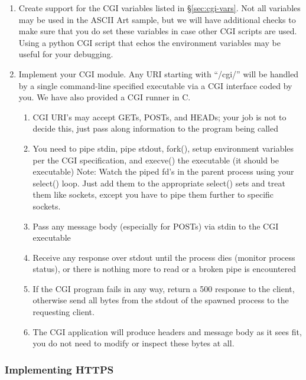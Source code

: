 \begin{enumerate}
  
  \item Create support for the CGI variables listed in \S\ref{sec:cgi-vars}. Not all variables may be used in the ASCII Art sample, but we will have additional checks to make sure that you do set these variables in case other CGI scripts are used. Using a python CGI script that echos the environment variables may be useful for your debugging.
\item Implement your CGI module. Any URI starting with ``/cgi/'' will be handled by a single command-line specified executable via a CGI interface coded by you. We have also provided a CGI runner in C. 
\begin{enumerate}
    \item CGI URI's may accept GETs, POSTs, and HEADs; your job is not to decide this, just pass along information to the program being called
    \item You need to pipe stdin, pipe stdout, fork(), setup environment variables per the CGI specification, and execve() the executable (it should be executable) Note: Watch the piped fd's in the parent process using your select() loop. Just add them to the appropriate select() sets and treat them like sockets, except you have to pipe them further to specific sockets.
    \item Pass any message body (especially for POSTs) via stdin to the CGI executable
    \item Receive any response over stdout until the process dies (monitor process status), or there is nothing more to read or a broken pipe is encountered
    \item If the CGI program fails in any way, return a 500 response to the client, otherwise send all bytes from the stdout of the spawned process to the requesting client.
    \item The CGI application will produce headers and message body as it sees fit, you do not need to modify or inspect these bytes at all.
\end{enumerate}
\end{enumerate}

\subsubsection{Implementing HTTPS}

